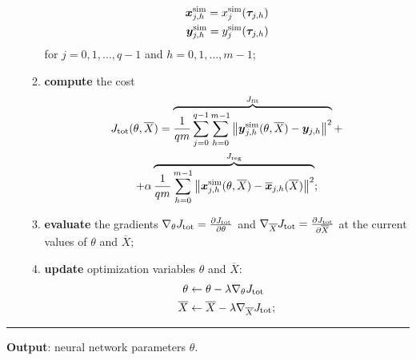 \documentclass{article} %
\newcommand{\batchsize}{q}
\newcommand{\seqlen}{m}
\newcommand{\numiter}{n}
\newcommand{\tens}[1]{\bm{#1}}
\newcommand{\simul}[1]{{#1}^{\rm sim}}
\newcommand{\hidden}[1]{\overline{#1}}
\newcommand{\norm}[1]{\left\lVert#1\right\rVert}
\newcommand{\est}{}
\renewcommand{\theenumi}{\arabic{enumi}}
\renewcommand{\theenumii}{\arabic{enumii}}
\begin{document}
\begin{algorithm}
\begin{enumerate}[label=\arabic*., ref=\theenumi{}]
\begin{enumerate}[label=\theenumi{}.\arabic*., ref=\theenumi{}.\theenumii{}]
\begin{align*}
 \simul{{\tens{x}}}_{j,h} = \simul{x}_j(\tens{\tau}_{j,h}) \\
  \simul{\est{\tens{y}}}_{j,h} = \simul{\est y}_j(\tens{\tau}_{j,h}) %
 \end{align*}
 for $j\!=\!0,1,\dots,\batchsize\!-\!1$ and $h\!=\!0,1,\dots,\seqlen\!-\!1$;
			\item \textbf{compute} the cost  
\begin{multline*}
\label{eq:simulation_cost_tot_algo}
J_{\rm tot}(\theta,\hidden{X}) = 
\overbrace{ \frac{1}{\batchsize \seqlen}\sum_{j=0}^{\batchsize-1}\sum_{h=0}^{\seqlen-1} \norm{{\tens{\est{y}}}^{\rm sim}_{j,h}(\theta, \hidden{X}) - {{\tens{y}}}_{j,h}}^2}^{J_{\rm fit}} + \\
+\alpha\overbrace{\frac{1}{\batchsize \seqlen} \sum_{h=0}^{\seqlen-1} \norm{{\tens{x}}^{\rm sim}_{j,h}(\theta, \hidden{X}) - \hidden{{\tens{x}}}_{j,h}(\hidden{X})}^2}^{J_{\rm reg}};
\end{multline*}


\item \textbf{evaluate} the gradients $\nabla_\theta J_{\rm tot}=\frac{\partial J_{\rm tot}}{\partial \theta}$ and  
			$\nabla_{\hidden{X}} J_{\rm tot}=\frac{\partial J_{\rm tot}}{\partial \hidden{X}}$ at the current values of $\theta$ and $\hidden{X}$;
			\item  \textbf{update} optimization variables $\theta$ and $\hidden{X}$:
			\begin{equation*}
			\label{eq:SGD}
			\begin{split}
			 \theta &\leftarrow \theta - \lambda \nabla_\theta J_{\rm tot}  \\
			 \hidden{X} & \leftarrow \hidden{X} - \lambda \nabla_{\hidden{X}} J_{\rm tot};
			\end{split}
			\end{equation*}
		\end{enumerate}
	\end{enumerate}
	\vspace*{-.0cm}\hrule\vspace*{.1cm}
	\textbf{Output}:  neural network parameters $\theta$. 
\end{algorithm} 
\end{document}
